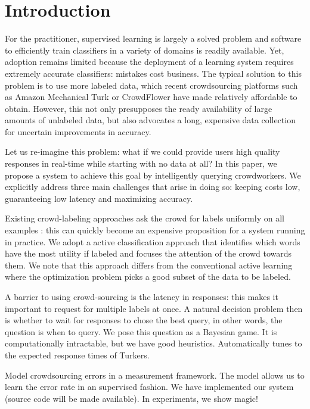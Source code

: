 \section{Introduction}

For the practitioner, supervised learning is largely a solved problem and software to efficiently train classifiers in a variety of domains is readily available.
Yet, adoption remains limited because the deployment of a learning system requires extremely accurate classifiers: mistakes cost business.
The typical solution to this problem is to use more labeled data, which recent crowdsourcing platforms such as Amazon Mechanical Turk\needcite{} or CrowdFlower\needcite{} have made relatively affordable to obtain.
However, this not only presupposes the ready availability of large amounts of unlabeled data, but also advocates a long, expensive data collection for uncertain improvements in accuracy.

Let us re-imagine this problem:
what if we could provide users high quality responses in real-time while starting with no data at all?
In this paper, we propose a system to achieve this goal by intelligently querying crowdworkers.
We explicitly address three main challenges that arise in doing so: keeping costs low, guaranteeing low latency and maximizing accuracy.

Existing crowd-labeling approaches ask the crowd for labels uniformly on all examples \needcite: this can quickly become an expensive proposition for a system running in practice. 
We adopt a active classification approach that identifies which words have the most utility if labeled and focuses the attention of the crowd towards them.
We note that this approach differs from the conventional active learning where the optimization problem picks a good subset of the data to be labeled.

A barrier to using crowd-sourcing is the latency in responses: this makes it important to request for multiple labels at once.
A natural decision problem then is whether to wait for responses to chose the best query, in other words, the question is when to query.
We pose this question as a Bayesian game.
It is computationally intractable, but we have good heuristics.
Automatically tunes to the expected response times of Turkers.

Model crowdsourcing errors in a measurement framework.
The model allows us to learn the error rate in an supervised fashion.
We have implemented our system (source code will be made available).
In experiments, we show magic!

